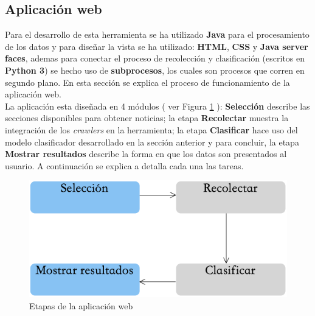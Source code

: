 \subsection{Aplicación web}

Para el desarrollo de esta  herramienta se ha utilizado \textbf{Java} para el procesamiento de los datos y para diseñar la vista se ha utilizado: \textbf{HTML}, \textbf{CSS} y \textbf{Java server faces}, ademas para conectar el proceso de recolección y clasificación (escritos en \textbf{Python 3}) se hecho uso de \textbf{subprocesos}, los cuales son procesos que corren en segundo plano. En esta sección se explica el proceso de funcionamiento de la aplicación web.\\

La aplicación esta diseñada en 4 módulos ( ver Figura \ref{fig:procesoAppWeb} ): \textbf{Selección} describe las secciones disponibles para obtener noticias; la etapa \textbf{Recolectar} muestra la integración de los \textit{crawlers} en la herramienta; la etapa \textbf{Clasificar} hace uso del modelo clasificador desarrollado en la sección anterior y para concluir, la etapa \textbf{Mostrar resultados} describe la forma en que los datos son presentados al usuario. A continuación se explica a detalla cada una las tareas.


\begin{figure}[h]
	\centering
	\includegraphics[scale=0.4]{imagenes/Aplicacion/Proceso.png}
	\caption{Etapas de la aplicación web}
	\label{fig:procesoAppWeb}
\end{figure}

